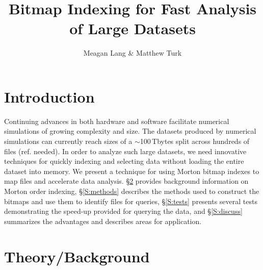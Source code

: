 \documentclass[apjl]{emulateapj}
\newcommand{\todo}[1]{{\color{red}{#1}}}
\newcommand{\addref}{{\color{red}(ref. needed)}}
\newcommand{\TB}{\,Tbytes}
\begin{document}

\title{Bitmap Indexing for Fast Analysis of Large Datasets}

\author{Meagan Lang \& Matthew Turk}




\begin{abstract}
\todo{write something}
\end{abstract}


\section{Introduction}\label{S:intro}
Continuing advances in both hardware and software facilitate numerical simulations of growing complexity and size. The datasets produced by numerical simulations can currently reach sizes of a $\sim$100\TB{ }split across hundreds of files \citep[e.g.][]{Croft2015}\addref. In order to analyze such large datasets, we need innovative techniques for quickly indexing and selecting data without loading the entire dataset into memory. We present a technique for using Morton bitmap indexes to map files and accelerate data analysis. \S\ref{S:theory} provides background information on Morton order indexing, \S\ref{S:methods} describes the methods used to construct the bitmaps and use them to identify files for queries, \S\ref{S:tests} presents several tests demonstrating the speed-up provided for querying the data, and \S\ref{S:discuss} summarizes the advantages and describes areas for application.

\section{Theory/Background}\label{S:theory}
\end{document}
